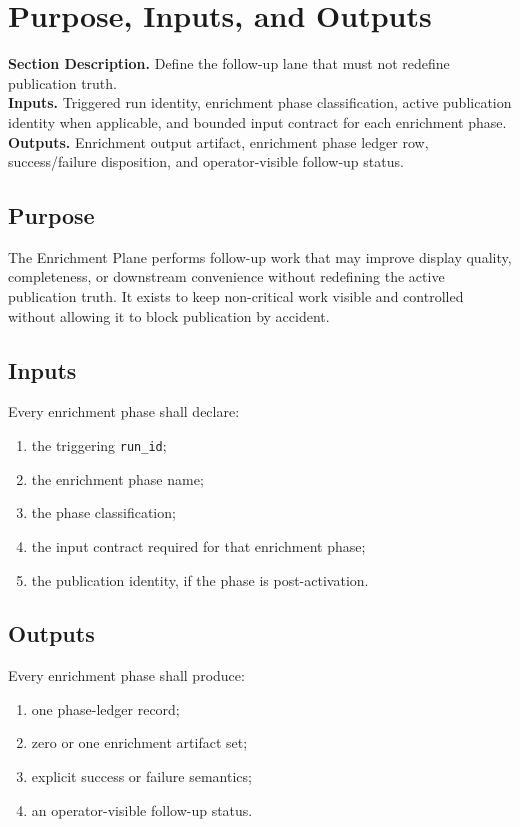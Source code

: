 \documentclass[11pt]{report}
\newcommand{\meta}[3]{\textbf{Section Description.} #1\\
\textbf{Inputs.} #2\\
\textbf{Outputs.} #3\par}
\begin{document}
\section{Purpose, Inputs, and Outputs}
\meta{Define the follow-up lane that must not redefine publication truth.}{Triggered run identity, enrichment phase classification, active publication identity when applicable, and bounded input contract for each enrichment phase.}{Enrichment output artifact, enrichment phase ledger row, success/failure disposition, and operator-visible follow-up status.}

\subsection{Purpose}
The Enrichment Plane performs follow-up work that may improve display quality, completeness, or downstream convenience without redefining the active publication truth. It exists to keep non-critical work visible and controlled without allowing it to block publication by accident.

\subsection{Inputs}
Every enrichment phase shall declare:
\begin{enumerate}[leftmargin=1.2cm]
    \item the triggering \texttt{run\_id};
    \item the enrichment phase name;
    \item the phase classification;
    \item the input contract required for that enrichment phase;
    \item the publication identity, if the phase is post-activation.
\end{enumerate}

\subsection{Outputs}
Every enrichment phase shall produce:
\begin{enumerate}[leftmargin=1.2cm]
    \item one phase-ledger record;
    \item zero or one enrichment artifact set;
    \item explicit success or failure semantics;
    \item an operator-visible follow-up status.
\end{enumerate}
\end{document}
